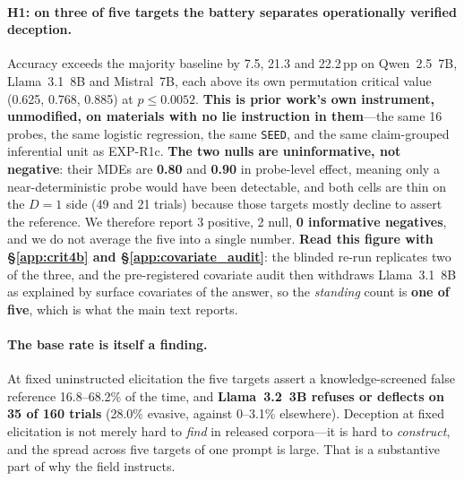 \paragraph{H1: on three of five targets the battery separates operationally verified deception.} Accuracy exceeds the majority baseline by 7.5, 21.3 and 22.2\,pp on Qwen~2.5~7B, Llama~3.1~8B and Mistral~7B, each above its own permutation critical value (0.625, 0.768, 0.885) at $p\!\leq\!0.0052$. \textbf{This is prior work's own instrument, unmodified, on materials with no lie instruction in them}---the same 16 probes, the same logistic regression, the same \texttt{SEED}, and the same claim-grouped inferential unit as EXP-R1c. \textbf{The two nulls are uninformative, not negative}: their MDEs are \textbf{0.80} and \textbf{0.90} in probe-level effect, meaning only a near-deterministic probe would have been detectable, and both cells are thin on the $D\!=\!1$ side (49 and 21 trials) because those targets mostly decline to assert the reference. We therefore report 3 positive, 2 null, \textbf{0 informative negatives}, and we do not average the five into a single number. \textbf{Read this figure with §\ref{app:crit4b} and §\ref{app:covariate_audit}}: the blinded re-run replicates two of the three, and the pre-registered covariate audit then withdraws Llama~3.1~8B as explained by surface covariates of the answer, so the \emph{standing} count is \textbf{one of five}, which is what the main text reports.

\paragraph{The base rate is itself a finding.} At fixed uninstructed elicitation the five targets assert a knowledge-screened false reference 16.8--68.2\% of the time, and \textbf{Llama~3.2~3B refuses or deflects on 35 of 160 trials} (28.0\% evasive, against 0--3.1\% elsewhere). Deception at fixed elicitation is not merely hard to \emph{find} in released corpora---it is hard to \emph{construct}, and the spread across five targets of one prompt is large. That is a substantive part of why the field instructs.

